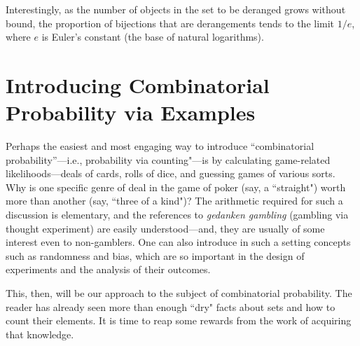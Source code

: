 \medskip

Interestingly, as the number of objects in the set to be deranged grows without bound, the
proportion of bijections that are derangements tends to the limit $1/e$, where $e$ is Euler's
constant (the base of natural logarithms).

\section{Introducing Combinatorial Probability via Examples}
\label{sec:combinatorial-prob}

 

Perhaps the easiest and most engaging way to introduce ``combinatorial probability''---i.e., probability via counting"---is by calculating game-related likelihoods---deals of cards, rolls of dice, and guessing games of various sorts.  Why is one specific genre of deal in the game of poker (say, a ``straight") worth more than another (say, ``three of a kind")?  The arithmetic required for such a discussion is elementary, and the references to {\it gedanken gambling} (gambling via thought experiment) are easily understood---and, they are usually of some interest even to non-gamblers.  One can also introduce in such a setting concepts such as randomness and bias, which are so important in the design of experiments and the analysis of their outcomes.

\smallskip

This, then, will be our approach to the subject of combinatorial probability.  The reader has already seen more than enough ``dry" facts about sets and how to count their elements.  It is time to reap some rewards from the work of acquiring that knowledge. 

